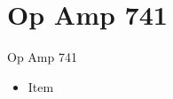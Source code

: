 \section{Op Amp 741}
\begin{frame}{Op Amp 741}
	\begin{itemize}
		\item Item
	\end{itemize}
\end{frame}